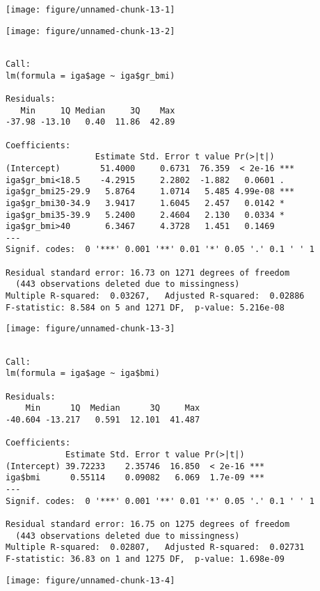 \documentclass[11pt,a4paper]{article}\usepackage[]{graphicx}\usepackage[]{color}
\makeatletter
\def\maxwidth{ %
  \ifdim\Gin@nat@width>\linewidth
    \linewidth
  \else
    \Gin@nat@width
  \fi
}
\newenvironment{kframe}{%
 \def\at@end@of@kframe{}%
 \ifinner\ifhmode%
  \def\at@end@of@kframe{\end{minipage}}%
  \begin{minipage}{\columnwidth}%
 \fi\fi%
 \def\FrameCommand##1{\hskip\@totalleftmargin \hskip-\fboxsep
 \colorbox{shadecolor}{##1}\hskip-\fboxsep
     \hskip-\linewidth \hskip-\@totalleftmargin \hskip\columnwidth}%
 \MakeFramed {\advance\hsize-\width
   \@totalleftmargin\z@ \linewidth\hsize
   \@setminipage}}%
 {\par\unskip\endMakeFramed%
 \at@end@of@kframe}
\newenvironment{knitrout}{}{} %
\makeatother
\begin{document}
\begin{knitrout}
\color{fgcolor}
\texttt{[image: figure/unnamed-chunk-13-1]} 

\texttt{[image: figure/unnamed-chunk-13-2]} 
\begin{kframe}\begin{verbatim}

Call:
lm(formula = iga$age ~ iga$gr_bmi)

Residuals:
   Min     1Q Median     3Q    Max 
-37.98 -13.10   0.40  11.86  42.89 

Coefficients:
                  Estimate Std. Error t value Pr(>|t|)    
(Intercept)        51.4000     0.6731  76.359  < 2e-16 ***
iga$gr_bmi<18.5    -4.2915     2.2802  -1.882   0.0601 .  
iga$gr_bmi25-29.9   5.8764     1.0714   5.485 4.99e-08 ***
iga$gr_bmi30-34.9   3.9417     1.6045   2.457   0.0142 *  
iga$gr_bmi35-39.9   5.2400     2.4604   2.130   0.0334 *  
iga$gr_bmi>40       6.3467     4.3728   1.451   0.1469    
---
Signif. codes:  0 '***' 0.001 '**' 0.01 '*' 0.05 '.' 0.1 ' ' 1

Residual standard error: 16.73 on 1271 degrees of freedom
  (443 observations deleted due to missingness)
Multiple R-squared:  0.03267,	Adjusted R-squared:  0.02886 
F-statistic: 8.584 on 5 and 1271 DF,  p-value: 5.216e-08
\end{verbatim}
\end{kframe}
\texttt{[image: figure/unnamed-chunk-13-3]} 
\begin{kframe}\begin{verbatim}

Call:
lm(formula = iga$age ~ iga$bmi)

Residuals:
    Min      1Q  Median      3Q     Max 
-40.604 -13.217   0.591  12.101  41.487 

Coefficients:
            Estimate Std. Error t value Pr(>|t|)    
(Intercept) 39.72233    2.35746  16.850  < 2e-16 ***
iga$bmi      0.55114    0.09082   6.069  1.7e-09 ***
---
Signif. codes:  0 '***' 0.001 '**' 0.01 '*' 0.05 '.' 0.1 ' ' 1

Residual standard error: 16.75 on 1275 degrees of freedom
  (443 observations deleted due to missingness)
Multiple R-squared:  0.02807,	Adjusted R-squared:  0.02731 
F-statistic: 36.83 on 1 and 1275 DF,  p-value: 1.698e-09
\end{verbatim}
\end{kframe}
\texttt{[image: figure/unnamed-chunk-13-4]} 


\end{knitrout}
\end{document}
